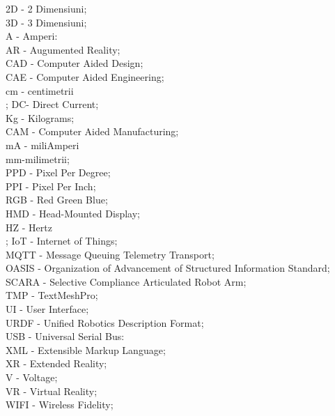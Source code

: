 \documentclass[a4paper,12pt]{report}
\begin{document}
\noindent 
2D - 2 Dimensiuni;\\
3D - 3 Dimensiuni; \\
A - Amperi:\\
AR - Augumented Reality;\\
CAD - Computer Aided Design;\\
CAE - Computer Aided Engineering;\\
cm - centimetrii\\;
DC- Direct Current;\\
Kg - Kilograms;\\
CAM - Computer Aided Manufacturing;\\
mA - miliAmperi\\
mm-milimetrii;\\
PPD - Pixel Per Degree;\\
PPI - Pixel Per Inch;\\
RGB - Red Green Blue;\\
HMD - Head-Mounted Display; \\
HZ - Hertz\\;
IoT - Internet of Things;\\
MQTT - Message Queuing Telemetry Transport;\\
OASIS - Organization of Advancement of Structured Information Standard;\\
SCARA - Selective Compliance Articulated Robot Arm;\\
TMP - TextMeshPro;\\
UI - User Interface;\\
URDF - Unified Robotics Description Format;\\
USB - Universal Serial Bus:\\
XML - Extensible Markup Language;\\
XR - Extended Reality;\\
V  - Voltage;\\
VR - Virtual Reality;\\
WIFI - Wireless Fidelity;\\

\clearpage

 
\end{document}
